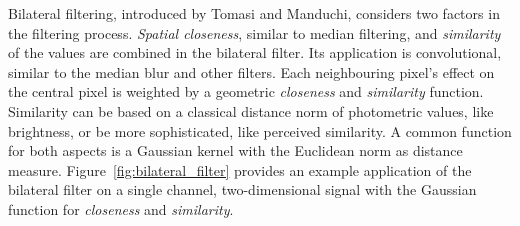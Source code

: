 Bilateral filtering, introduced by Tomasi and Manduchi\cite{tomasi_iccv98}, considers two factors in the filtering process.
\emph{Spatial closeness}, similar to median filtering, and \emph{similarity} of the values are combined in the bilateral filter.
Its application is convolutional, similar to the median blur and other filters.
Each neighbouring pixel's effect on the central pixel is weighted by a geometric \emph{closeness} and \emph{similarity} function.
Similarity can be based on a classical distance norm of photometric values, like brightness, or be more sophisticated, like perceived similarity.
A common function for both aspects is a Gaussian kernel with the Euclidean norm as distance measure.
Figure~\ref{fig:bilateral_filter} provides an example application of the bilateral filter on a single channel, two-dimensional signal with the Gaussian function for \emph{closeness} and \emph{similarity}.

